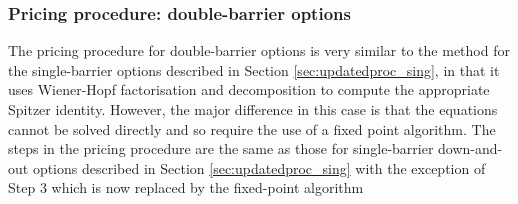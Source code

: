 \documentclass[11pt,a4paper]{article}
\begin{document}
\subsubsection{Pricing procedure: double-barrier options}\label{sec:updatedproc_doub}

The pricing procedure for double-barrier options is very similar to the method for the single-barrier options described in Section \ref{sec:updatedproc_sing}, in that it uses Wiener-Hopf factorisation and decomposition to compute the appropriate Spitzer identity. However, the major difference in this case is that the equations cannot be solved directly and so require the use of a fixed point algorithm. The steps in the pricing procedure are the same as those for single-barrier down-and-out options described in Section \ref{sec:updatedproc_sing} with the exception of Step 3 which is now replaced by the fixed-point algorithm
\end{document}

